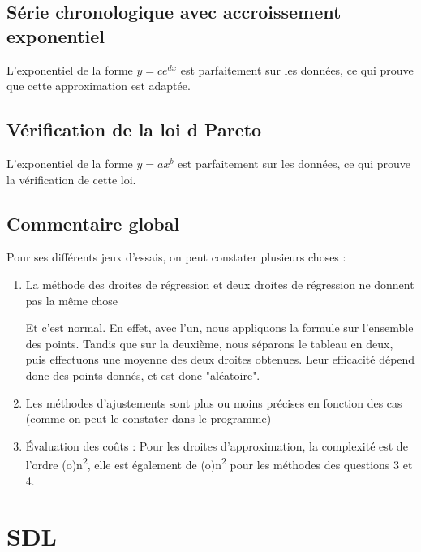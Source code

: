 \documentclass[letter]{article}
\begin{document}
\subsection{Série chronologique avec accroissement exponentiel}
\label{sec:orga51dd6a}

L'exponentiel de la forme \(y = ce^{dx}\) est parfaitement sur les données, ce qui prouve que cette approximation est adaptée.

\subsection{Vérification de la loi d Pareto}
\label{sec:org415b517}

L'exponentiel de la forme \(y = ax^b\) est parfaitement sur les données, ce qui prouve la vérification de cette loi.

\subsection{Commentaire global}
\label{sec:orgff3ab84}

Pour ses différents jeux d'essais, on peut constater plusieurs choses :

\begin{enumerate}
\item La méthode des droites de régression et deux droites de régression ne donnent pas la même chose

Et c'est normal. En effet, avec l'un, nous appliquons la formule sur l'ensemble des points. Tandis que sur la deuxième, nous séparons le tableau en deux, puis effectuons une moyenne des deux droites obtenues. Leur efficacité dépend donc des points donnés, et est donc "aléatoire".

\item Les méthodes d'ajustements sont plus ou moins précises en fonction des cas (comme on peut le constater dans le programme)

\item Évaluation des coûts :
Pour les droites d'approximation, la complexité est de l'ordre (o)n\textsuperscript{2}, elle est également de (o)n\textsuperscript{2} pour les méthodes des questions 3 et 4.
\end{enumerate}


\section{SDL}
\label{sec:orgb9d8e38}
\end{document}
